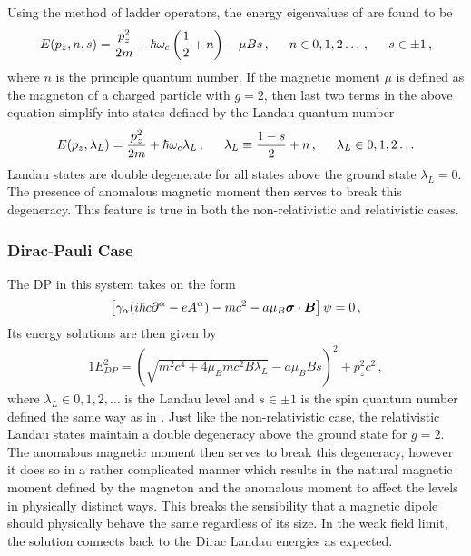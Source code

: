 Using the method of ladder operators, the energy eigenvalues of  are found to be
\begin{alignat}{1}
	\label{eq:homogeneous:14} E(p_{z},n,s) = \frac{p_{z}^{2}}{2m}+\hbar\omega_{c}\left(\frac{1}{2}+n\right)-\mu Bs\,,\indent n\in0,1,2\ldots\,,\indent s\in\pm1\,,
\end{alignat}
where $n$ is the principle quantum number. If the magnetic moment $\mu$ is defined as the magneton of a charged particle with $g=2$, then last two terms in the above equation simplify into states defined by the Landau quantum number
\begin{alignat}{1}
	\label{eq:homogeneous:15} E(p_{z},\lambda_{L}) = \frac{p_{z}^{2}}{2m}+\hbar\omega_{c}\lambda_{L}\,,\indent\lambda_{L}\equiv\frac{1-s}{2}+n\,,\indent\lambda_{L}\in0,1,2\ldots
\end{alignat}
Landau states are double degenerate for all states above the ground state $\lambda_{L}=0$. The presence of anomalous magnetic moment then serves to break this degeneracy. This feature is true in both the non-relativistic and relativistic cases.

\subsubsection{Dirac-Pauli Case}\label{ajsss:diracpauli}
\noindent The DP  in this system takes on the form
\begin{alignat}{1}
	\label{eq:diracpauli:05} \left[\gamma_{\alpha}(i\hbar c\partial^{\alpha}-eA^{\alpha})-mc^{2}-a\mu_{B}\boldsymbol{\sigma}\cdot\boldsymbol{B}\right]\psi=0\,,
\end{alignat}
Its energy solutions \cite{Johnson:1950zz,OConnell:1968,Tsai:1971zma} are then given by
\begin{alignat}{1}
	\label{eq:diracpauli:06} E^{2}_{DP}=\left(\sqrt{m^{2}c^{4}+4\mu_{B}mc^{2}B\lambda_{L}}-a\mu_{B}Bs\right)^{2}+p_{z}^{2}c^{2}\,,
\end{alignat}
where $\lambda_{L}\in0,1,2,\ldots$ is the Landau level and $s\in\pm1$ is the spin quantum number defined the same way as in . Just like the non-relativistic case, the relativistic Landau states maintain a double degeneracy above the ground state for $g=2$. The anomalous magnetic moment then serves to break this degeneracy, however it does so in a rather complicated manner which results in the natural magnetic moment defined by the magneton and the anomalous moment to affect the levels in physically distinct ways. This breaks the sensibility that a magnetic dipole should physically behave the same regardless of its size. In the weak field limit, the solution connects back to the Dirac Landau energies as expected.

